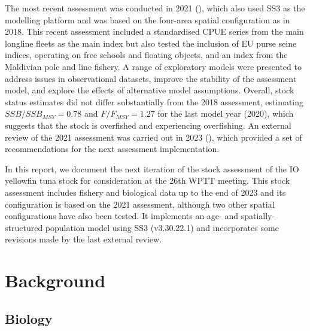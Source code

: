 \documentclass[
]{scrartcl}
\begin{document}
The most recent assessment was conducted in 2021
(), which
also used SS3 as the modelling platform and was based on the four-area
spatial configuration as in 2018. This recent assessment included a
standardised CPUE series from the main longline fleets as the main index
but also tested the inclusion of EU purse seine indices, operating on
free schools and floating objects, and an index from the Maldivian pole
and line fishery. A range of exploratory models were presented to
address issues in observational datasets, improve the stability of the
assessment model, and explore the effects of alternative model
assumptions. Overall, stock status estimates did not differ
substantially from the 2018 assessment, estimating
\(SSB/SSB_{MSY}=0.78\) and \(F/F_{MSY}=1.27\) for the last model year
(2020), which suggests that the stock is overfished and experiencing
overfishing. An external review of the 2021 assessment was carried out
in 2023 (), which provided a set of recommendations for the next
assessment implementation.

In this report, we document the next iteration of the stock assessment
of the IO yellowfin tuna stock for consideration at the 26th WPTT
meeting. This stock assessment includes fishery and biological data up
to the end of 2023 and its configuration is based on the 2021
assessment, although two other spatial configurations have also been
tested. It implements an age- and spatially-structured population model
using SS3 (v3.30.22.1) and incorporates some revisions made by the last
external review.

\section{Background}\label{background}

\subsection{Biology}\label{biology}
\end{document}
